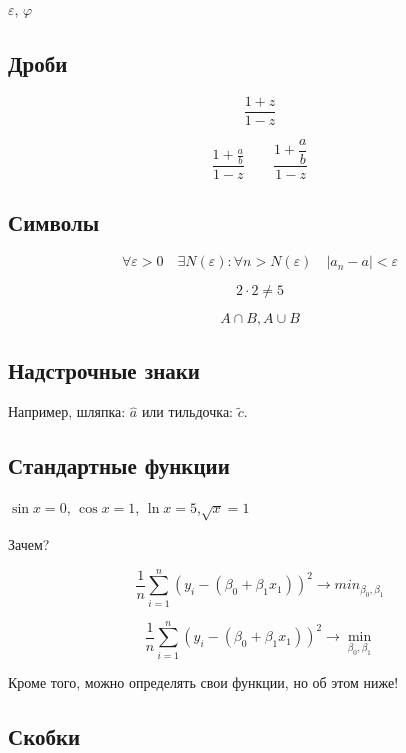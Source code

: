 \documentclass[12pt, a4paper]{article}
\begin{document}
$\varepsilon$, $\varphi$


\subsection{Дроби}

\[\frac{1 + z}{1 - z}\]

\[\frac{1 + \frac{a}{b}}{1 - z} \qquad \frac{1 + \dfrac{a}{b}}{1 - z}\]

\subsection{Символы}

\[ \forall \varepsilon > 0 \quad  \exists N(\varepsilon) : \forall n > N(\varepsilon) \quad |a_n - a| < \varepsilon \]

\[ 2 \cdot 2 \ne 5 \]

\[ A \cap B, A \cup B \]


\subsection{Надстрочные знаки}

Например, шляпка: $\hat{a}$ или тильдочка: $\tilde{c}$.

\subsection{Стандартные функции}

$\sin x = 0$, $ \cos x = 1$, $\ln x = 5$,$\sqrt x = 1$



Зачем? 

\begin{equation} %
\frac{1}{n} \sum_{i=1}^n (y_i - (\beta_0 + \beta_1 x_1))^2 	\to min_{\beta_0, \beta_1} 
\end{equation}


\begin{equation} %
\frac{1}{n} \sum_{i=1}^n (y_i - (\beta_0 + \beta_1 x_1))^2 	\to \min_{\beta_0, \beta_1} 
\end{equation}


Кроме того, можно определять свои функции, но об этом ниже!


\subsection{Скобки}
\end{document}

